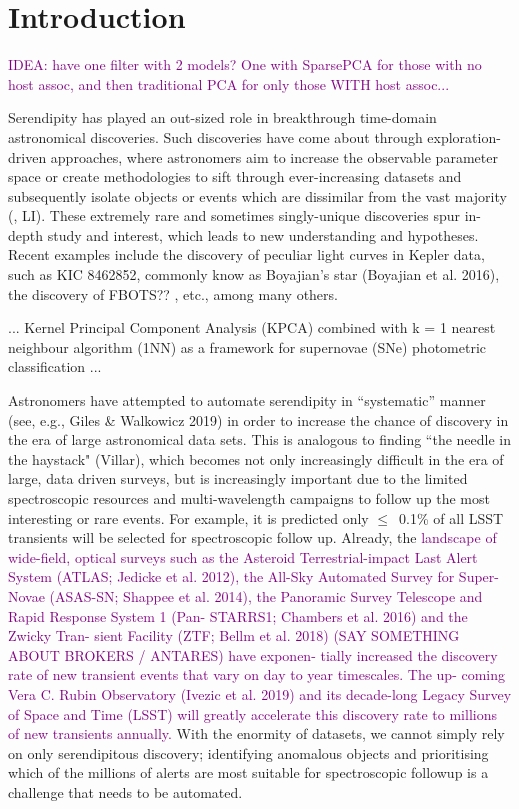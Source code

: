 \documentclass[twocolumn]{aastex63}
\newcommand{\pat}{\textcolor{purple}}
\begin{document}
\section{Introduction} \label{sec:intro}

\pat{IDEA: have one filter with 2 models? One with SparsePCA for those with no host assoc, and then traditional PCA for only those WITH host assoc...}

Serendipity has played an out-sized role in breakthrough time-domain astronomical discoveries. Such discoveries have come about through exploration-driven approaches, where astronomers aim to increase the observable parameter space or create methodologies to sift through ever-increasing datasets and subsequently isolate objects or events which are dissimilar from the vast majority (\citep{Galarza2021}, LI). These extremely rare and sometimes singly-unique discoveries spur in-depth study and interest, which leads to new understanding and hypotheses. Recent examples include the discovery of peculiar light curves in Kepler data, such as KIC 8462852, commonly know as Boyajian’s star (Boyajian et al. 2016), the discovery of FBOTS?? , etc., among many others. \par 

... Kernel Principal Component Analysis (KPCA) combined with k = 1 nearest neighbour algorithm (1NN) as a framework for supernovae (SNe) photometric classification \citep{Ishida2013}...

Astronomers have attempted to automate serendipity in ``systematic'' manner (see, e.g., Giles \& Walkowicz 2019) in order to increase the chance of discovery in the era of large astronomical data sets. This is analogous to finding ``the needle in the haystack" (Villar), which becomes not only increasingly difficult in the era of large, data driven surveys, but is increasingly important due to the limited spectroscopic resources and multi-wavelength campaigns to follow up the most interesting or rare events. For example, it is predicted only $\leq$~0.1\% of all LSST transients will be selected for spectroscopic follow up. Already, the \pat{landscape of wide-field, optical surveys such as the Asteroid Terrestrial-impact Last Alert System (ATLAS; Jedicke et al. 2012), the All-Sky Automated Survey for Super- Novae (ASAS-SN; Shappee et al. 2014), the Panoramic Survey Telescope and Rapid Response System 1 (Pan- STARRS1; Chambers et al. 2016) and the Zwicky Tran- sient Facility (ZTF; Bellm et al. 2018) (SAY SOMETHING ABOUT BROKERS / ANTARES) have exponen- tially increased the discovery rate of new transient events that vary on day to year timescales. The up- coming Vera C. Rubin Observatory (Ivezic et al. 2019) and its decade-long Legacy Survey of Space and Time (LSST) will greatly accelerate this discovery rate to millions of new transients annually.} With the enormity of datasets, we cannot simply rely on only serendipitous discovery; identifying anomalous objects and prioritising which of the millions of alerts are most suitable for spectroscopic followup is a challenge that needs to be automated. \par
\end{document}
